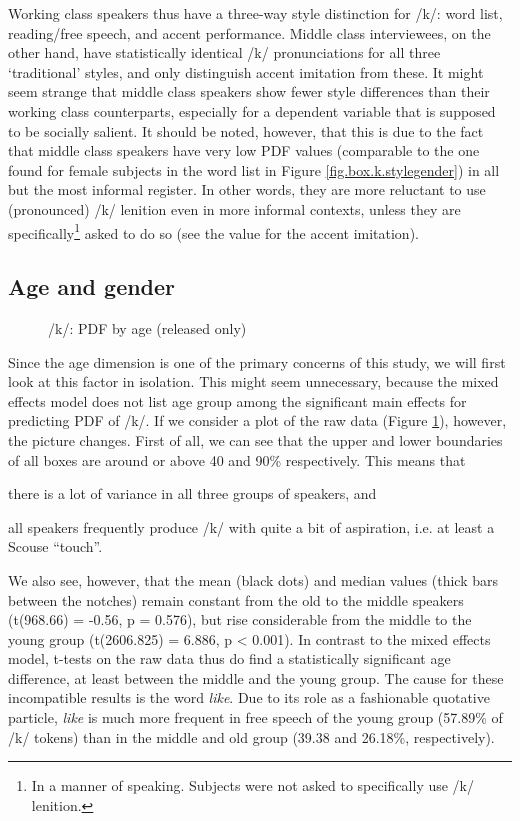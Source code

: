 Working class speakers thus have a three-way style distinction for /k/: word list, reading/free speech, and accent performance.
Middle class interviewees, on the other hand, have statistically identical /k/ pronunciations for all three `traditional' styles, and only distinguish accent imitation from these.
It might seem strange that middle class speakers show fewer style differences than their working class counterparts, especially for a dependent variable that is supposed to be socially salient.
It should be noted, however, that this is due to the fact that middle class speakers have very low PDF values (comparable to the one found for female subjects in the word list in Figure \ref{fig.box.k.stylegender}) in all but the most informal register.
In other words, they are more reluctant to use (pronounced) /k/ lenition even in more informal contexts, unless they are specifically\footnote{In a manner of speaking. Subjects were not asked to specifically use /k/ lenition.} asked to do so (see the value for the accent imitation).

\subsection{Age and gender}
\label{sec.prod.res.con.k.agegender}

\begin{figure}[h]
	\centering
		\resizebox{0.5\linewidth}{!}{} 
	\caption{/k/: PDF by age (released only)}
	\label{fig.box.k.tot}
\end{figure}

Since the age dimension is one of the primary concerns of this study, we will first look at this factor in isolation.
This might seem unnecessary, because the mixed effects model does not list age group among the significant main effects for predicting PDF of /k/.
If we consider a plot of the raw data (Figure \ref{fig.box.k.tot}), however, the picture changes.
First of all, we can see that the upper and lower boundaries of all boxes are around or above 40 and 90\% respectively.
This means that
\begin{inparaenum}[(a)]
	\item there is a lot of variance in all three groups of speakers, and
	\item all speakers frequently produce /k/ with quite a bit of aspiration, i.e. at least a Scouse ``touch''.
\end{inparaenum}
We also see, however, that the mean (black dots) and median values (thick bars between the notches) remain constant from the old to the middle speakers (t(968.66) = -0.56, p = 0.576), but rise considerable from the middle to the young group (t(2606.825) = 6.886, p < 0.001).
In contrast to the mixed effects model, t-tests on the raw data thus do find a statistically significant age difference, at least between the middle and the young group.
The cause for these incompatible results is the word \emph{like}.
Due to its role as a fashionable quotative particle, \emph{like} is much more frequent in free speech of the young group (57.89\% of /k/ tokens) than in the middle and old group (39.38 and 26.18\%, respectively).


